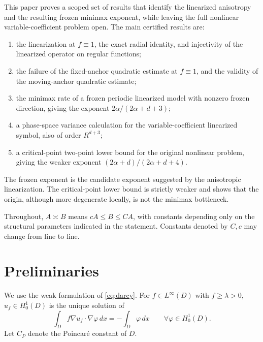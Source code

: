 \documentclass[12pt]{article}
\theoremstyle{remark}
\newcommand{\asym}{\asymp}
\begin{document}
This paper proves a scoped set of results that identify the linearized anisotropy and the resulting frozen minimax exponent, while leaving the full nonlinear variable-coefficient problem open. The main certified results are:
\begin{enumerate}[label=(\roman*)]
\item the linearization at \(f\equiv1\), the exact radial identity, and injectivity of the linearized operator on regular functions;
\item the failure of the fixed-anchor quadratic estimate at \(f\equiv1\), and the validity of the moving-anchor quadratic estimate;
\item the minimax rate of a frozen periodic linearized model with nonzero frozen direction, giving the exponent \(2\alpha/(2\alpha+d+3)\);
\item a phase-space variance calculation for the variable-coefficient linearized symbol, also of order \(R^{d+3}\);
\item a critical-point two-point lower bound for the original nonlinear problem, giving the weaker exponent \((2\alpha+d)/(2\alpha+d+4)\).
\end{enumerate}
The frozen exponent is the candidate exponent suggested by the anisotropic linearization. The critical-point lower bound is strictly weaker and shows that the origin, although more degenerate locally, is not the minimax bottleneck.

Throughout, \(A\asym B\) means \(cA\le B\le CA\), with constants depending only on the structural parameters indicated in the statement. Constants denoted by \(C,c\) may change from line to line.

\section{Preliminaries}
\label{sec:prelim}

We use the weak formulation of \eqref{eq:darcy}. For \(f\in L^\infty(D)\) with \(f\ge \lambda>0\), \(u_f\in H^1_0(D)\) is the unique solution of
\begin{equation}
\label{eq:weak-forward}
\int_D f\nabla u_f\cdot \nabla\varphi\,dx
=
-\int_D \varphi\,dx
\qquad \forall \varphi\in H^1_0(D).
\end{equation}
Let \(C_P\) denote the Poincar\'e constant of \(D\).
\end{document}
